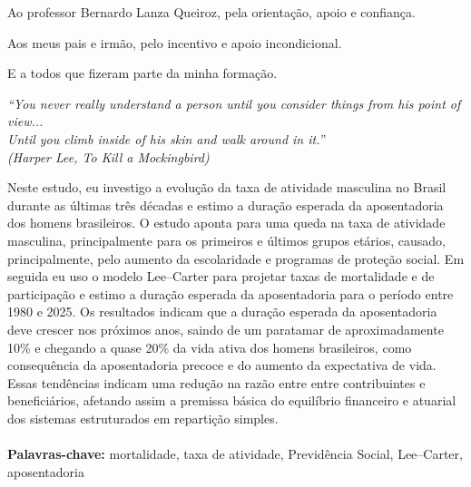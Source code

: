 \documentclass[12pt, 						%
			openright, 					%
			twoside,					%
			a4paper,x					%
			english,					%
			brazil]{abntex2}				%
\begin{document}
\imprimircapa							%
\imprimirfolhaderosto*						%


\begin{dedicatoria}
	\vspace*{\fill}
		
	\vspace*{\fill}
\end{dedicatoria}


\begin{agradecimentos}
Ao professor Bernardo Lanza Queiroz, pela orientação, apoio e confiança. 

Aos meus pais e irmão, pelo incentivo e apoio incondicional.

E a todos que fizeram parte da minha formação.
\end{agradecimentos}



\begin{epigrafe}
	\vspace*{\fill}
	\begin{flushright}
\textit{“You never really understand a person until you consider things from his point of view... \\ Until you climb inside of his skin and walk around in it.” \\
(Harper Lee, To Kill a Mockingbird)}
	\end{flushright}
\end{epigrafe}


\begin{resumo}
Neste estudo, eu investigo a evolução da taxa de atividade masculina no Brasil durante as últimas três décadas e estimo a duração esperada da aposentadoria dos homens brasileiros. O estudo aponta para uma queda na taxa de atividade masculina, principalmente para os primeiros e últimos grupos etários, causado, principalmente, pelo aumento da escolaridade e programas de proteção social. Em seguida eu uso o modelo Lee--Carter para projetar taxas de mortalidade e de participação e estimo a duração esperada da aposentadoria para o período entre 1980 e 2025. Os resultados indicam que a duração esperada da aposentadoria deve crescer nos próximos anos, saindo de um paratamar de aproximadamente 10\% e chegando a quase 20\% da vida ativa dos homens brasileiros, como consequência da aposentadoria precoce e do aumento da expectativa de vida. Essas tendências indicam uma redução na razão entre  entre contribuintes e beneficiários, afetando assim a premissa básica do equilíbrio financeiro e atuarial dos sistemas estruturados em repartição simples.
\\ \\
\textbf{Palavras-chave:} mortalidade, taxa de atividade, Previdência Social, Lee--Carter, aposentadoria 
\end{resumo}
\end{document}
